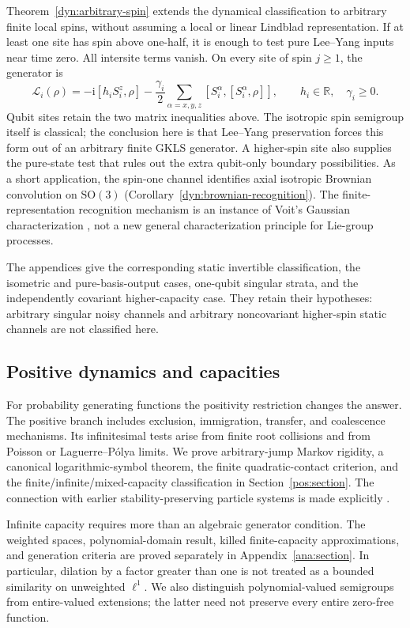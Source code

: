 \documentclass[reqno]{amsart}
\theoremstyle{definition}
\theoremstyle{remark}
\newcommand{\R}{\mathbb R}
\begin{document}
Theorem~\ref{dyn:arbitrary-spin} extends the dynamical classification
to arbitrary finite local spins, without assuming a local or linear
Lindblad representation. If at least one site has spin above one-half,
it is enough to test pure Lee--Yang inputs near time zero. All
intersite terms vanish. On every site of spin $j\ge1$, the generator is
\[
 \mathcal L_i(\rho)=-\mathrm i[h_iS_i^z,\rho]
       -\frac{\gamma_i}{2}\sum_{\alpha=x,y,z}
                   [S_i^\alpha,[S_i^\alpha,\rho]],
 \qquad h_i\in\R,\quad\gamma_i\ge0.
\]
Qubit sites retain the two matrix inequalities above. The isotropic
spin semigroup itself is classical; the conclusion here is that
Lee--Yang preservation forces this form out of an arbitrary finite
GKLS generator. A higher-spin site also supplies the pure-state
test that rules out the extra qubit-only boundary possibilities.
As a short application, the spin-one channel identifies axial
isotropic Brownian convolution on $\mathrm{SO}(3)$
(Corollary~\ref{dyn:brownian-recognition}).
The finite-representation recognition mechanism is an instance
of Voit's Gaussian characterization \cite{Voit03}, not a new
general characterization principle for Lie-group processes.

The appendices give the corresponding static invertible
classification, the isometric and pure-basis-output cases,
one-qubit singular strata, and the independently covariant
higher-capacity case. They retain their hypotheses: arbitrary
singular noisy channels and arbitrary noncovariant higher-spin
static channels are not classified here.

\subsection{Positive dynamics and capacities}

For probability generating functions the positivity restriction
changes the answer. The positive branch includes exclusion,
immigration, transfer, and coalescence mechanisms. Its infinitesimal
tests arise from finite root collisions and from Poisson or
Laguerre--P\'olya limits. We prove arbitrary-jump Markov rigidity,
a canonical logarithmic-symbol theorem, the finite quadratic-contact
criterion, and the finite/infinite/mixed-capacity classification
in Section~\ref{pos:section}. The connection with earlier
stability-preserving particle systems is made explicitly
\cite{BBL09,LVR10}.

Infinite capacity requires more than an algebraic generator condition.
The weighted spaces, polynomial-domain result, killed
finite-capacity approximations, and generation criteria are proved
separately in Appendix~\ref{ana:section}.
In particular, dilation by a factor greater than one is not treated
as a bounded similarity on unweighted $\ell^1$.
We also distinguish polynomial-valued semigroups from entire-valued
extensions; the latter need not preserve every entire zero-free
function.
\end{document}
